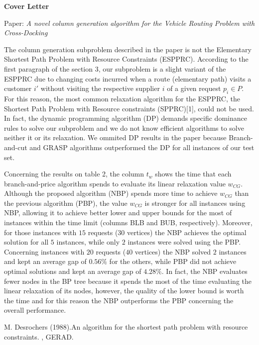 \documentclass[12pt]{article}
\begin{document}
\vspace{1cm}

\begin{center}
\textbf{Cover Letter}
\end{center}

\noindent Paper: \emph{A novel column generation algorithm for the Vehicle Routing Problem with Cross-Docking}

\vspace{1cm}

The column generation subproblem described in the paper is not the Elementary Shortest Path Problem with Resource Constraints (ESPPRC). According to the first paragraph of the section 3, our subproblem is a slight variant of the ESPPRC due to changing costs incurred when a route (elementary path) visits a customer $i'$ without visiting the respective supplier $i$ of a given request $p_i \in P$. For this reason, the most common relaxation algorithm for the ESPPRC, the Shortest Path Problem with Resource constraints (SPPRC)[1], could not be used. In fact, the dynamic programming algorithm (DP) demands specific dominance rules to solve our subproblem and we do not know efficient algorithms to solve neither it or its relaxation. We ommited DP results in the paper because Branch-and-cut and GRASP algorithms outperformed the DP for all instances of our test set.

\vspace{1cm}

Concerning the results on table 2, the column $t_w$ shows the time that each branch-and-price algorithm spends to evaluate its linear relaxation value $w_{CG}$. Although the proposed algorithm (NBP) spends more time to achieve $w_{CG}$ than the previous algorithm (PBP), the value $w_{CG}$ is stronger for all instances using NBP, allowing it to achieve better lower and upper bounds for the most of instances within the time limit (columns BLB and BUB, respectively). Moreover, for those instances with $15$ requests ($30$ vertices) the NBP achieves the optimal solution for all $5$ instances, while only $2$ instances were solved using the PBP. Concerning instances with $20$ requests ($40$ vertices) the NBP solved $2$ instances and kept an average gap of $0.56\%$ for the others, while PBP did not achieve optimal solutions and kept an average gap of $4.28\%$. In fact, the NBP evaluates fewer nodes in the BP tree because it spends the most of the time evaluating the linear relaxation of its nodes, however, the quality of the lower bound is worth the time and for this reason the NBP outperforms the PBP concerning the overall performance.

\vspace{1cm}

\noindent[1] M. Desrochers (1988).\newblock An algorithm for the shortest path problem with resource constraints. , GERAD.
\end{document}
